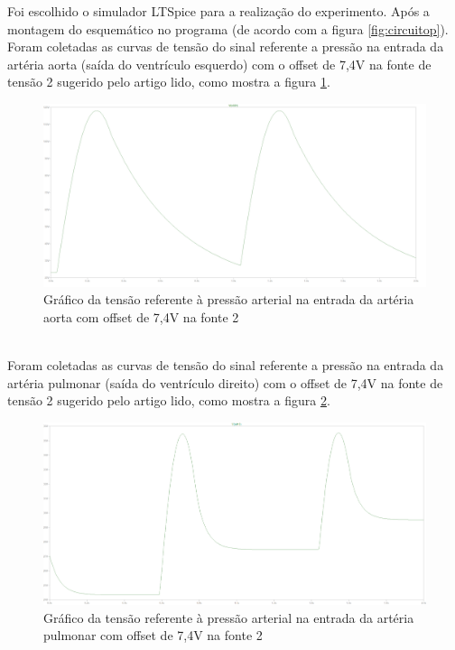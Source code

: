 \documentclass{abntex2}
\begin{document}
Foi escolhido o simulador LTSpice para a realização do experimento. Após a montagem do esquemático no programa (de acordo com a figura \ref{fig:circuitop}).
\\Foram coletadas as curvas de tensão do sinal referente a pressão na entrada da artéria aorta (saída do ventrículo esquerdo) com o offset de 7,4V na fonte de tensão 2 sugerido pelo artigo lido, como mostra a figura \ref{fig:aorta1}.
\pagebreak
\begin{figure}[h]
  \centering
  \includegraphics[scale = 0.3]{aorta_v10_v274.png}
  \caption{Gráfico da tensão referente à pressão arterial na entrada da artéria aorta com offset de 7,4V na fonte 2}
  \label{fig:aorta1}
\end{figure}

\\Foram coletadas as curvas de tensão do sinal referente a pressão na entrada da artéria pulmonar (saída do ventrículo direito) com o offset de 7,4V na fonte de tensão 2 sugerido pelo artigo lido, como mostra a figura \ref{fig:pulmonar1}.

\begin{figure}[h]
  \centering
  \includegraphics[scale = 0.3]{pulmonar_v10_v274.png}
  \caption{Gráfico da tensão referente à pressão arterial na entrada da artéria pulmonar com offset de 7,4V na fonte 2}
  \label{fig:pulmonar1}
\end{figure}
\end{document}
